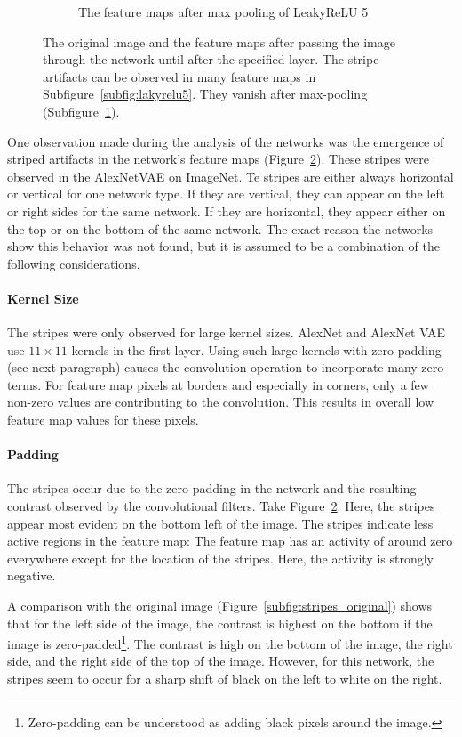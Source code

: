\begin{figure}
\begin{subfigure}{0.3\textwidth}
        \caption{The feature maps after max pooling of LeakyReLU 5}
        \label{subfig:maxpool}
    \end{subfigure}
    \caption[Feature map stripes]{The original image and the feature maps after passing the image through the network until after the specified layer. The stripe artifacts can be observed in many feature maps in Subfigure~\ref{subfig:lakyrelu5}. They vanish after max-pooling (Subfigure~\ref{subfig:maxpool}).}
    \label{fig:stripes}
\end{figure}


One observation made during the analysis of the networks was the emergence of striped artifacts in the network's feature maps (Figure~\ref{fig:stripes}).
These stripes were observed in the AlexNetVAE on ImageNet.
Te stripes are either always horizontal or vertical for one network type.
If they are vertical, they can appear on the left or right sides for the same network.
If they are horizontal, they appear either on the top or on the bottom of the same network.
The exact reason the networks show this behavior was not found, but it is assumed to be a combination of the following considerations.

\paragraph{Kernel Size}
The stripes were only observed for large kernel sizes.
AlexNet and AlexNet \ac{VAE} use $11\times 11$ kernels in the first layer.
Using such large kernels with zero-padding (see next paragraph) causes the convolution operation to incorporate many zero-terms.
For feature map pixels at borders and especially in corners, only a few non-zero values are contributing to the convolution.
This results in overall low feature map values for these pixels.

\paragraph{Padding}
The stripes occur due to the zero-padding in the network and the resulting contrast observed by the convolutional filters.
Take Figure~\ref{fig:stripes}.
Here, the stripes appear most evident on the bottom left of the image.
The stripes indicate less active regions in the feature map: The feature map has an activity of around zero everywhere except for the location of the stripes.
Here, the activity is strongly negative.

A comparison with the original image (Figure~\ref{subfig:stripes_original}) shows that for the left side of the image, the contrast is highest on the bottom if the image is zero-padded\footnote{Zero-padding can be understood as adding black pixels around the image.}.
The contrast is high on the bottom of the image, the right side, and the right side of the top of the image.
However, for this network, the stripes seem to occur for a sharp shift of black on the left to white on the right.

